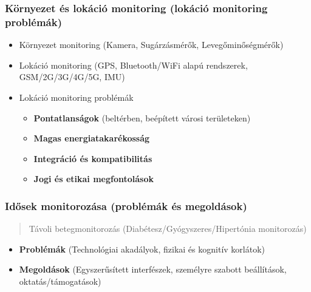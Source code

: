 \subsubsection{Környezet és lokáció monitoring (lokáció monitoring problémák)}
\begin{itemize}
    \item Környezet monitoring (Kamera, Sugárzásmérők, Levegőminőségmérők)
    \item Lokáció monitoring (GPS, Bluetooth/WiFi alapú rendszerek, GSM/2G/3G/4G/5G, IMU)
    \item Lokáció monitoring problémák
    \begin{itemize}
        \item \textbf{Pontatlanságok} (beltérben, beépített városi területeken)
        \item \textbf{Magas energiatakarékosság}
        \item \textbf{Integráció és kompatibilitás}
        \item \textbf{Jogi és etikai megfontolások}
    \end{itemize}
\end{itemize}

\subsubsection{Idősek monitorozása (problémák és megoldások)}
\begin{quote}
    Távoli betegmonitorozás (Diabétesz/Gyógyszeres/Hipertónia monitorozás)
\end{quote}
\begin{itemize}
    \item \textbf{Problémák} (Technológiai akadályok, fizikai és kognitív korlátok)
    \item \textbf{Megoldások} (Egyszerűsített interfészek, személyre szabott beállítások, oktatás/támogatások)
\end{itemize}

